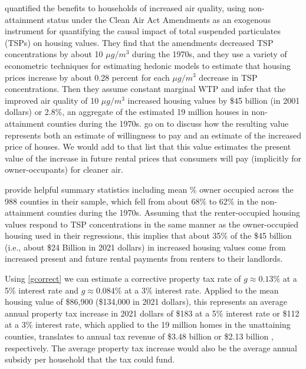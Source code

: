 \documentclass[ecta,nameyear,draft]{econsocart}
\theoremstyle{plain}
\theoremstyle{remark}
\begin{document}
\cite{chaygreenstone05} quantified the benefits to households of increased air quality, using non-attainment status under the Clean Air Act Amendments as an exogenous instrument for quantifying the causal impact of total suspended particulates (TSPs) on housing values. They find that the amendments decreased TSP concentrations by about 10 $\mu g/m^3$ during the 1970s, and they use a variety of econometric techniques for estimating hedonic models to estimate that housing prices increase by about 0.28 percent for each $\mu g/m^3$ decrease in TSP concentrations. Then they assume constant marginal WTP and infer that the improved air quality of 10 $\mu g/m^3$ increased housing values by \$45 billion (in 2001 dollars) or 2.8\%, an aggregate of the estimated 19 million houses in non-attainment counties during the 1970s. \cite{chaygreenstone05} go on to discuss how the resulting value represents both an estimate of willingness to pay and an estimate of the increased price of houses. We would add to that list that this value estimates the present value of the increase in future rental prices that consumers will pay (implicitly for owner-occupants) for cleaner air.

\cite{chaygreenstone05} provide helpful summary statistics including mean \% owner occupied across the 988 counties in their sample, which fell from about 68\% to 62\% in the non-attainment counties during the 1970s. Assuming that the renter-occupied housing values respond to TSP concentrations in the same manner as the owner-occupied housing used in their regressions, this implies that about 35\% of the \$45 billion (i.e., about \$24 Billion in 2021 dollars) in increased housing values come from increased present and future rental payments from renters to their landlords. 

Using \ref{gcorrect} we can estimate a corrective property tax rate of $g\approx 0.13\%$ at a 5\% interest rate and $g\approx 0.084\%$ at a 3\% interest rate. Applied to the mean housing value of \$86,900 (\$134,000 in 2021 dollars), this represents an average annual property tax increase in 2021 dollars of \$183 at a 5\% interest rate or \$112 at a 3\% interest rate, which applied to the 19 million homes in the unattaining counties, translates to annual tax revenue of \$3.48 billion %
or \$2.13 billion 
, respectively. The average property tax increase would also be the average annual subsidy per household that the tax could fund. 

\end{document}
